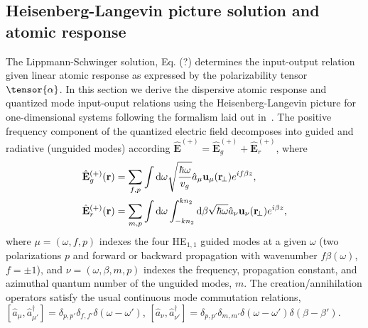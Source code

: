 \documentclass[preprint,aps,pra,onecolumn]{revtex4-1} %
\begin{document}
\subsection{Heisenberg-Langevin picture solution and atomic response}
The Lippmann-Schwinger solution, Eq. (?) determines the input-output relation given linear atomic response as expressed by the polarizability tensor $\tensor{\alpha}$.  In this section we derive the dispersive atomic response and quantized mode input-ouput relations using the Heisenberg-Langevin picture for one-dimensional systems following the formalism laid out in~\cite{Haikuta}.  The positive frequency component of the quantized electric field decomposes into guided and radiative (unguided modes) according  $\hat{\mathbf{E}}^{(+)}=\hat{\mathbf{E}}_g^{(+)}+\hat{\mathbf{E}}_{r}^{(+)}$, where
\begin{align}
\hat{\mathbf{E}}_g^{(+)}(\mathbf{r}) &= \sum_{f,p} \int \mathrm{d}\omega\sqrt{\frac{\hbar \omega}{v_g}} \hat{a}_\mu \mathbf{u}_\mu (\mathbf{r}\!_\perp) e^{if\beta z},\\
\hat{\mathbf{E}}_r^{(+)}(\mathbf{r}) &= \sum_{m,p} \int \mathrm{d}\omega\int_{-kn_2}^{kn_2}\mathrm{d}\beta \sqrt{\hbar \omega} \hat{a}_\nu \mathbf{u}_\nu (\mathbf{r}\!_\perp) e^{i\beta z},
\end{align}
where $\mu =(\omega, f, p)$ indexes the four HE$_{1,1}$ guided modes at a given $\omega$ (two polarizations $p$ and forward or backward propagation with wavenumber $f\beta (\omega)$, $f=\pm1$), and $\nu=(\omega, \beta, m, p)$ indexes the frequency, propagation constant, and azimuthal quantum number of the unguided modes, $m$.  The creation/annihilation operators satisfy the usual continuous mode commutation relations, $[\hat{a}_\mu, \hat{a}^\dag_{\mu'} ] = \delta_{p,p'} \delta_{f,f'} \delta ( \omega - \omega ') $, $[\hat{a}_\nu ,\hat{a}^\dag_{\nu'} ] = \delta_{p,p'} \delta_{m,m'} \delta ( \omega - \omega ')  \delta ( \beta - \beta') $.
\end{document}

